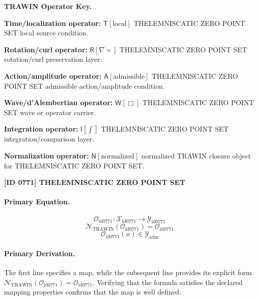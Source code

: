 \par\vspace{0.45\baselineskip}
\noindent\begin{minipage}[t]{\linewidth}
\begingroup
\small
\raggedright
\textbf{TRAWIN Operator Key.}\par
\noindent\textbf{Time/localization operator:} $\mathsf{T}\!\left[\mathrm{local}\right]$ THELEMNISCATIC ZERO POINT SET local source condition.\par
\noindent\textbf{Rotation/curl operator:} $\mathsf{R}\!\left[\nabla\times\right]$ THELEMNISCATIC ZERO POINT SET rotation/curl preservation layer.\par
\noindent\textbf{Action/amplitude operator:} $\mathsf{A}\!\left[\mathrm{admissible}\right]$ THELEMNISCATIC ZERO POINT SET admissible action/amplitude condition.\par
\noindent\textbf{Wave/d'Alembertian operator:} $\mathsf{W}\!\left[\Box\right]$ THELEMNISCATIC ZERO POINT SET wave or operator carrier.\par
\noindent\textbf{Integration operator:} $\mathsf{I}\!\left[\int\right]$ THELEMNISCATIC ZERO POINT SET integration/comparison layer.\par
\noindent\textbf{Normalization operator:} $\mathsf{N}\!\left[\mathrm{normalized}\right]$ normalized TRAWIN closure object for THELEMNISCATIC ZERO POINT SET.\par
\endgroup
\end{minipage}

\clearpage
\noindent\textbf{[ID 0771] THELEMNISCATIC ZERO POINT SET}\par
\vspace{0.35em}
\paragraph{Primary Equation.}
\[
\mathcal{O}_{\mathrm{id0771}}:\mathcal{X}_{\mathrm{id0771}}\longrightarrow\mathcal{Y}_{\mathrm{id0771}}
\]
\[
\mathcal{N}_{\mathrm{TRAWIN}}(\mathcal{O}_{\mathrm{id0771}})=\mathcal{O}_{\mathrm{id0771}}
\]
\[
\mathcal{O}_{\mathrm{id0771}}(x)\in\mathcal{Y}_{\mathrm{adm}}
\]

\paragraph{Primary Derivation.}
The first line specifies a map, while the subsequent line provides its explicit form \( \mathcal{N}_{\mathrm{TRAWIN}}(\mathcal{O}_{\mathrm{id0771}})=\mathcal{O}_{\mathrm{id0771}} \). Verifying that the formula satisfies the declared mapping properties confirms that the map is well defined.
